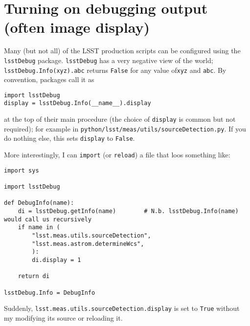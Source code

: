 \section{Turning on debugging output (often image display)}

Many (but not all) of the LSST production scripts can be configured using the \verb|lsstDebug| package. \verb|lsstDebug| has a very negative view of the world; \verb|lsstDebug.Info(xyz).abc| returns \verb|False| for any value of\verb|xyz| and \verb|abc|.  By convention, packages call it as
\begin{verbatim}
import lsstDebug
display = lsstDebug.Info(__name__).display
\end{verbatim}
at the top of their main procedure (the choice of \verb|display| is common but not required); for example in \texttt{python/lsst/meas/utils/sourceDetection.py}. If you do nothing else, this sets \verb|display| to \verb|False|.

More interestingly, I can \verb|import| (or \verb|reload|) a file that loos something like:

\begin{verbatim}
import sys

import lsstDebug

def DebugInfo(name):
    di = lsstDebug.getInfo(name)        # N.b. lsstDebug.Info(name) would call us recursively
    if name in (
        "lsst.meas.utils.sourceDetection",
        "lsst.meas.astrom.determineWcs",
        ):
        di.display = 1

    return di

lsstDebug.Info = DebugInfo
\end{verbatim}

Suddenly, \verb|lsst.meas.utils.sourceDetection.display| is set to \verb|True| without my modifying its source or reloading it.

